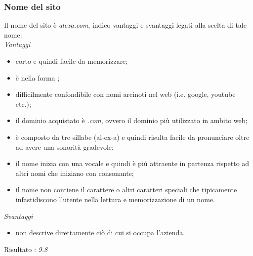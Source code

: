 \subsubsection{Nome del sito}
Il nome del sito è \textit{alexa.com}, indico vantaggi e svantaggi legati alla scelta di tale nome: \\
\textit{Vantaggi}
\begin{itemize}
	\item corto e quindi facile da memorizzare;
	\item è nella forma ;
	\item difficilmente confondibile con nomi arcinoti nel web (i.e. google, youtube etc.);
	\item il dominio acquistato è \textit{.com}, ovvero il dominio più utilizzato in ambito web;
	\item è composto da tre sillabe (al-ex-a) e quindi risulta facile da pronunciare
	oltre ad avere una sonorità gradevole;
	\item il nome inizia con una vocale e quindi è più attraente in partenza rispetto
	ad altri nomi che iniziano con consonante;
	\item il nome non contiene il carattere \quotes{-} o altri caratteri speciali
	che tipicamente infastidiscono l'utente nella lettura e memorizzazione di un nome.
\end{itemize}
\textit{Svantaggi}
\begin{itemize}
	\item non descrive direttamente ciò di cui si occupa l'azienda.
\end{itemize}
Risultato : \textit{9.8}
